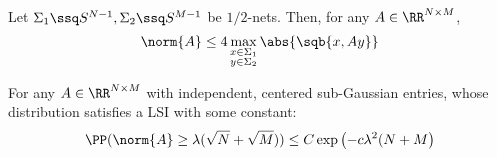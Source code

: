 \begin{thm}
    Let $\Sigma_1 \ssq S^{N-1}, \Sigma_2 \ssq S^{M-1}$ be $1/2$-nets. Then, for any $A\in \RR^{N\times M}$,
    $$ \norm{A} \leq 4 \max_{\substack{x\in \Sigma_1 \\ y \in \Sigma_2}} \abs{\sqb{x,Ay}}$$
\end{thm}


\begin{remark}[Summary]
    For any $A\in \RR^{N \times M}$ with independent, centered sub-Gaussian entries, whose distribution satisfies a LSI with some constant:
    $$\PP(\norm{A} \geq \lambda(\sqrt{N}+\sqrt{M})) \leq C \exp\left( -c \lambda^2(N+M\right)$$
\end{remark}